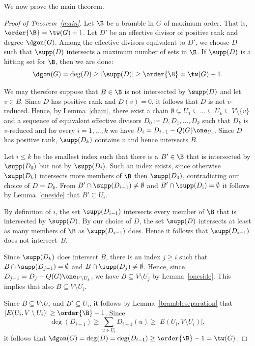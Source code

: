 \noindent We now prove the main theorem.
\begin{proof}[Proof of Theorem~\ref{main}]
Let $\B$ be a bramble in $G$ of maximum order. That is, $\order{\B} = \tw(G)+1$. Let $D'$ be an effective divisor of positive rank and degree $\dgon(G)$. Among the effective divisors equivalent to $D'$, we choose $D$ such that $\supp(D)$ intersects a maximum number of sets in $\B$. If $\supp(D)$ is a hitting set for $\B$, then we are done:
\begin{equation}
\dgon(G)=\deg(D) \geq |\supp(D)| \geq \order{\B} = \tw(G)+1.
\end{equation}

We may therefore suppose that $B\in\B$ is not intersected by $\supp(D)$ and let $v\in B$. Since $D$ has positive rank and $D(v)=0$, it follows that $D$ is not $v$-reduced. Hence, by Lemma~\ref{chain}, there exist a chain $\emptyset\subsetneq U_1\subseteq\ldots\subseteq U_k\subseteq V\setminus{\{v\}}$ and a sequence of equivalent effective divisors $D_0\coloneqq D,D_1,\ldots,D_k$ such that $D_k$ is $v$-reduced and for every $i=1,\ldots, k$ we have $D_i=D_{i-1}-Q(G)\one_{U_i}$. Since $D$ has positive rank, $\supp(D_k)$ contains $v$ and hence intersects $B$.

Let $i\leq k$ be the smallest index such that there is a $B'\in \B$ that is intersected by $\supp(D_0)$ but not by $\supp(D_i)$. Such an index exists, since otherwise $\supp(D_k)$ intersects more members of $\B$ then $\supp(D_0)$, contradicting our choice of $D=D_0$. From $B'\cap \supp(D_{i-1})\neq \emptyset$ and $B'\cap \supp(D_{i})=\emptyset$ it follows by Lemma~\ref{oneside} that $B'\subseteq U_i$. 

By definition of $i$, the set $\supp(D_{i-1})$ intersects every member of $\B$ that is intersected by $\supp(D)$. By our choice of $D$, the set $\supp(D)$ intersects at least as many members of $\B$ as $\supp(D_{i-1})$ does. Hence it follows that $\supp(D_{i-1})$ does not intersect~$B$. 

Since $\supp(D_k)$ does intersect $B$, there is an index $j\geq i$ such that $B\cap \supp(D_{j-1})=\emptyset$ and $B\cap \supp(D_{j})\neq\emptyset$. Hence, since $D_{j-1}=D_j-Q(G)\one_{V\setminus U_j}$, we have $B\subseteq V\setminus U_j$ by Lemma~\ref{oneside}. This implies that also $B\subseteq V\setminus U_i$. 

Since $B\subseteq V\setminus U_i$ and $B'\subseteq U_i$, it follows by Lemma~\ref{brambleseparation} that $|E(U_i,V\setminus U_i)|\geq \order{\B}-1$. Since 
\begin{equation}
\deg (D_{i-1})\geq \sum_{u\in U_i}D_{i-1}(u)\geq |E(U_i,V\setminus U_i)|,
\end{equation}
it follows that $\dgon(G)=\deg(D) = \deg(D_{i-1}) \geq \order{\B} - 1 = \tw(G)$.
\end{proof}
